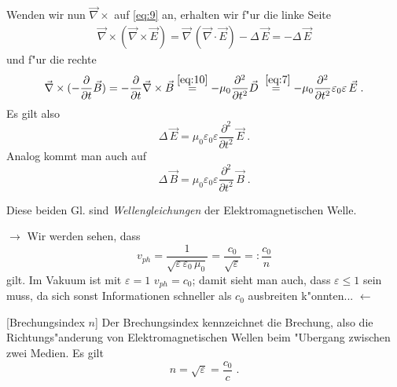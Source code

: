 \documentclass[twoside,a4paper]{book}
\newcommand{\Ve}[1]{\ensuremath{\vec{#1}}}
\newcommand{\Laplace}{\ensuremath{\Delta \,}}
\newcommand{\Rot}{\ensuremath{\Ve \nabla \times }}
\newcommand{\Grad}{\ensuremath{\Ve \nabla \,}}
\newcommand{\Div}{\ensuremath{\Ve \nabla \cdot }}
\newenvironment{Def}[1][]{%
\definecolor{shadethmcolor}{rgb}{.95,.95,.95}%
\definecolor{shaderulecolor}{rgb}{0.8,0.8,0.8}%
\setlength{\shadeboxrule}{1pt}%
\begin{Defi}[#1]%
 }{\end{Defi}}
\newenvironment*{Einschub}[0]{$\rightarrow$ \indent}{$\leftarrow$}
\begin{document}
Wenden wir nun $\Rot$ auf \eqref{eq:9} an, erhalten wir f"ur die linke Seite
\begin{eqnarray*}
   \Rot (\Rot \vec E) = \Grad (\Div\vec E) - \Laplace \vec E = - \Laplace
   \vec E
\end{eqnarray*}
und f"ur die rechte
\begin{eqnarray*}
   \Rot (-\frac{\partial }{\partial t}\vec B) = -\frac{\partial
   }{\partial t}\Rot \vec B 
\stackrel{\eqref{eq:10}}{=}
- \mu_0 \frac{\partial^2}{\partial t^2} \vec D
\stackrel{~\eqref{eq:7}}{=}
- \mu_0 \frac{\partial^2}{\partial t^2} \varepsilon_0 \varepsilon \,
\vec E \;.
\end{eqnarray*}
Es gilt also
\begin{equation}
   \label{eqn_wellengl_e}
 \boxed{\Laplace \vec E = \mu_0  \varepsilon_0 \varepsilon
   \frac{\partial^2}{\partial t^2} \, \vec E \;. }
\end{equation}
Analog kommt man auch auf
\begin{equation}
   \label{eqn_wellengl_b}
 \boxed{\Laplace \vec B = \mu_0  \varepsilon_0 \varepsilon
   \frac{\partial^2}{\partial t^2} \, \vec B \;. }
\end{equation}
\begin{Wichtig}
   Diese beiden Gl. sind
   \emph{Wellengleichungen} der
   Elektromagnetischen Welle.
\end{Wichtig}

\begin{Einschub}
   Wir werden sehen, dass
   \begin{equation}
      \label{eq:14}
      v_{ph} = \frac{1}{\sqrt{\varepsilon \, \varepsilon_0\,
          \mu_0}} = \frac{c_0}{\sqrt{\varepsilon}} =: \frac{c_0}{n}
   \end{equation}
   gilt. Im Vakuum ist mit $\varepsilon =1$ $v_{ph} = c_0$; damit
   sieht man auch, dass $\varepsilon \leq 1$ sein muss, da sich sonst
   Informationen schneller als $c_0$ ausbreiten k"onnten...
\end{Einschub}
\begin{Def}
   [Brechungsindex $n$]
   Der Brechungsindex kennzeichnet die Brechung, also die
   Richtungs"anderung von Elektromagnetischen Wellen beim "Ubergang
   zwischen zwei Medien. Es gilt
   \begin{equation}
      \label{eqn_def_n}
      n = \sqrt{\varepsilon} = \frac{c_0}{c} \;.
   \end{equation}
\end{Def}
\end{document}
